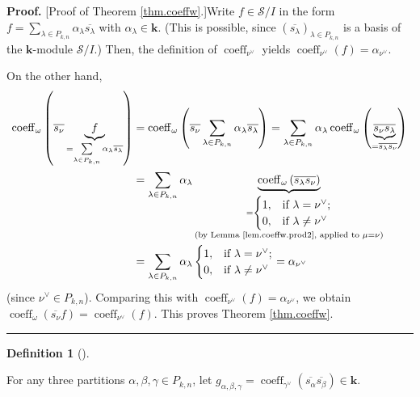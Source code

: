 \documentclass[numbers=enddot,12pt,final,onecolumn,notitlepage]{scrartcl}%
\theoremstyle{definition}
\newtheorem{defi}[theo]{Definition}
\newenvironment{definition}[1][]
{\begin{defi}[#1]\begin{leftbar}}
{\end{leftbar}\end{defi}}
\newenvironment{proof}[1][Proof]{\noindent\textbf{#1.} }{\ \rule{0.5em}{0.5em}}
\let\sumnonlimits\sum
\renewcommand{\sum}{\sumnonlimits\limits}
\begin{document}
\begin{proof}
[Proof of Theorem \ref{thm.coeffw}.]Write $f\in\mathcal{S}/I$ in the form
$f=\sum_{\lambda\in P_{k,n}}\alpha_{\lambda}\overline{s_{\lambda}}$ with
$\alpha_{\lambda}\in\mathbf{k}$. (This is possible, since $\left(
\overline{s_{\lambda}}\right)  _{\lambda\in P_{k,n}}$ is a basis of the
$\mathbf{k}$-module $\mathcal{S}/I$.) Then, the definition of
$\operatorname*{coeff}\nolimits_{\nu^{\vee}}$ yields $\operatorname*{coeff}%
\nolimits_{\nu^{\vee}}\left(  f\right)  =\alpha_{\nu^{\vee}}$.

On the other hand,%
\begin{align*}
\operatorname*{coeff}\nolimits_{\omega}\left(  \overline{s_{\nu}%
}\underbrace{f}_{=\sum_{\lambda\in P_{k,n}}\alpha_{\lambda}\overline
{s_{\lambda}}}\right)   &  =\operatorname*{coeff}\nolimits_{\omega}\left(
\overline{s_{\nu}}\sum_{\lambda\in P_{k,n}}\alpha_{\lambda}\overline
{s_{\lambda}}\right)  =\sum_{\lambda\in P_{k,n}}\alpha_{\lambda}%
\operatorname*{coeff}\nolimits_{\omega}\left(  \underbrace{\overline{s_{\nu}%
}\overline{s_{\lambda}}}_{=\overline{s_{\lambda}s_{\nu}}}\right) \\
&  =\sum_{\lambda\in P_{k,n}}\alpha_{\lambda}\underbrace{\operatorname*{coeff}%
\nolimits_{\omega}\left(  \overline{s_{\lambda}s_{\nu}}\right)  }_{\substack{=%
\begin{cases}
1, & \text{if }\lambda=\nu^{\vee};\\
0, & \text{if }\lambda\neq\nu^{\vee}%
\end{cases}
\\\text{(by Lemma \ref{lem.coeffw.prod2}, applied to }\mu=\nu\text{)}}}\\
&  =\sum_{\lambda\in P_{k,n}}\alpha_{\lambda}%
\begin{cases}
1, & \text{if }\lambda=\nu^{\vee};\\
0, & \text{if }\lambda\neq\nu^{\vee}%
\end{cases}
=\alpha_{\nu^{\vee}}%
\end{align*}
(since $\nu^{\vee}\in P_{k,n}$). Comparing this with $\operatorname*{coeff}%
\nolimits_{\nu^{\vee}}\left(  f\right)  =\alpha_{\nu^{\vee}}$, we obtain
$\operatorname*{coeff}\nolimits_{\omega}\left(  \overline{s_{\nu}}f\right)
=\operatorname*{coeff}\nolimits_{\nu^{\vee}}\left(  f\right)  $. This proves
Theorem \ref{thm.coeffw}.
\end{proof}

\begin{definition}
For any three partitions $\alpha,\beta,\gamma\in P_{k,n}$, let $g_{\alpha
,\beta,\gamma}=\operatorname*{coeff}\nolimits_{\gamma^{\vee}}\left(
\overline{s_{\alpha}}\overline{s_{\beta}}\right)  \in\mathbf{k}$.
\end{definition}
\end{document}
